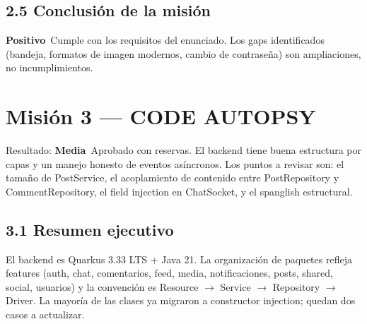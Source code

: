 \documentclass[10pt,a4paper]{article}
\newcommand{\badgeMedia}{\colorbox{yellow!35}{\textcolor{brown!90!black}{\textbf{\footnotesize Media}}}}
\newcommand{\badgePositivo}{\colorbox{green!20}{\textcolor{green!60!black}{\textbf{\footnotesize Positivo}}}}
\begin{document}
\subsection{2.5 Conclusión de la misión}
\badgePositivo\  Cumple con los requisitos del enunciado. Los gaps identificados (bandeja, formatos de imagen modernos, cambio de contraseña) son ampliaciones, no incumplimientos.\par\vspace{0.4em}
\section{Misión 3 --- CODE AUTOPSY}
Resultado: \badgeMedia\  Aprobado con reservas. El backend tiene buena estructura por capas y un manejo honesto de eventos asíncronos. Los puntos a revisar son: el tamaño de PostService, el acoplamiento de contenido entre PostRepository y CommentRepository, el field injection en ChatSocket, y el spanglish estructural.\par\vspace{0.4em}
\subsection{3.1 Resumen ejecutivo}
El backend es Quarkus 3.33 LTS + Java 21. La organización de paquetes refleja features (auth, chat, comentarios, feed, media, notificaciones, posts, shared, social, usuarios) y la convención es Resource $\rightarrow$ Service $\rightarrow$ Repository $\rightarrow$ Driver. La mayoría de las clases ya migraron a constructor injection; quedan dos casos a actualizar.\par\vspace{0.4em}
\end{document}
